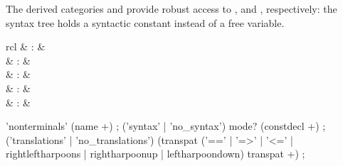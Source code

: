 \begin{isabellebody}
\begin{isamarkuptext}
  The derived categories \hypertarget{syntax.inner.num-const}{\hyperlink{syntax.inner.num-const}{\mbox{}}} and
  \hypertarget{syntax.inner.float-const}{\hyperlink{syntax.inner.float-const}{\mbox{}}} provide robust access to \hyperlink{syntax.inner.num}{\mbox{}}, and \hyperlink{syntax.inner.float-token}{\mbox{}}, respectively: the
  syntax tree holds a syntactic constant instead of a free variable.%
\end{isamarkuptext}%
\isamarkuptrue%
%
\isamarkuptrue%
%
\begin{isamarkuptext}%
\begin{matharray}{rcl}
    \hypertarget{command.nonterminals}{\hyperlink{command.nonterminals}{\mbox{}}} & : &  \\
    \hypertarget{command.syntax}{\hyperlink{command.syntax}{\mbox{}}} & : &  \\
    \hypertarget{command.no-syntax}{\hyperlink{command.no-syntax}{\mbox{}}} & : &  \\
    \hypertarget{command.translations}{\hyperlink{command.translations}{\mbox{}}} & : &  \\
    \hypertarget{command.no-translations}{\hyperlink{command.no-translations}{\mbox{}}} & : &  \\
  \end{matharray}

  \begin{rail}
    'nonterminals' (name +)
    ;
    ('syntax' | 'no\_syntax') mode? (constdecl +)
    ;
    ('translations' | 'no\_translations') (transpat ('==' | '=>' | '<=' | rightleftharpoons | rightharpoonup | leftharpoondown) transpat +)
    ;


\end{rail}
\end{isamarkuptext}
\end{isabellebody}
